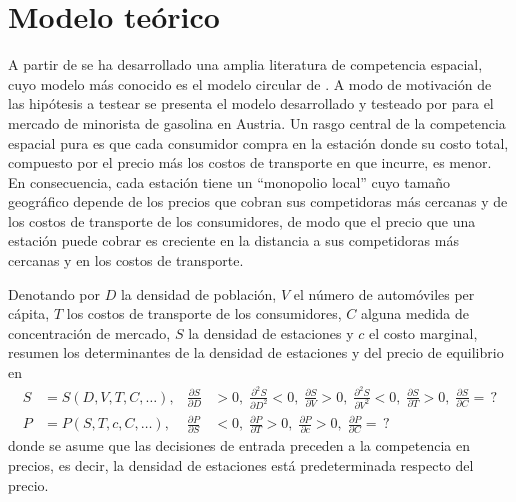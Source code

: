 \newcommand{\notacontroles}{\caption*{\footnotesize Fuente: Precios históricos de bencinaenlinea.cl. Log del precio $\times$ 100. Control $>$3 km: estaciones sin entradas a menos de 3 km (amplio), control $>$5 km: sin entradas a menos de 5 km (estricto). Errores estándar agrupados por comuna entre paréntesis. * p$<$0,10 ** p$<$0,05 *** p$<$0,01. Bins de seis meses desde la entrada, referencia en $-1$.}}
\newcommand{\notaes}{\caption*{\footnotesize Fuente: Precios históricos de bencinaenlinea.cl. Panel mensual 2012 a 2026, log del precio $\times$ 100. Errores estándar agrupados por comuna entre paréntesis. * p$<$0,10 ** p$<$0,05 *** p$<$0,01. Bins de seis meses desde la entrada, referencia en $-1$. Tratada: estación con una entrada competidora a 2 km o menos, control: estación sin entradas a menos de 5 km. Sin efecto fijo de estación (columnas 1 y 2) se controla por el indicador de tratada. Tratadas y controles: estaciones que usa cada modelo, sin los singletons.}}

\section{Modelo teórico} \label{sec:anexo_modelo}

A partir de \textcite{HOTELLING1929} se ha desarrollado una amplia literatura de competencia espacial, cuyo modelo más conocido es el modelo circular de \textcite{SALOP1979}. A modo de motivación de las hipótesis a testear se presenta el modelo desarrollado y testeado por \textcite{CLEMENZGUGLER2006} para el mercado de minorista de gasolina en Austria. Un rasgo central de la competencia espacial pura es que cada consumidor compra en la estación donde su costo total, compuesto por el precio más los costos de transporte en que incurre, es menor. En consecuencia, cada estación tiene un ``monopolio local'' cuyo tamaño geográfico depende de los precios que cobran sus competidoras más cercanas y de los costos de transporte de los consumidores, de modo que el precio que una estación puede cobrar es creciente en la distancia a sus competidoras más cercanas y en los costos de transporte.

Denotando por $D$ la densidad de población, $V$ el número de automóviles per cápita, $T$ los costos de transporte de los consumidores, $C$ alguna medida de concentración de mercado, $S$ la densidad de estaciones y $c$ el costo marginal, \textcite{CLEMENZGUGLER2006} resumen los determinantes de la densidad de estaciones y del precio de equilibrio en
\begin{align}
    S &= S(D, V, T, C, \ldots), & \frac{\partial S}{\partial D} &> 0,\; \frac{\partial^2 S}{\partial D^2} < 0,\; \frac{\partial S}{\partial V} > 0,\; \frac{\partial^2 S}{\partial V^2} < 0,\; \frac{\partial S}{\partial T} > 0,\; \frac{\partial S}{\partial C} = \,? \label{eq:cg_densidad} \\
    P &= P(S, T, c, C, \ldots), & \frac{\partial P}{\partial S} &< 0,\; \frac{\partial P}{\partial T} > 0,\; \frac{\partial P}{\partial c} > 0,\; \frac{\partial P}{\partial C} = \,? \nonumber
\end{align}
donde se asume que las decisiones de entrada preceden a la competencia en precios, es decir, la densidad de estaciones está predeterminada respecto del precio.

